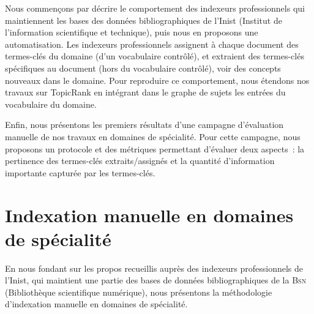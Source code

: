     Nous commençons par décrire le comportement des indexeurs
    professionnels qui maintiennent les bases des données bibliographiques de
    l'Inist (Institut de l'information scientifique et technique), puis nous en
    proposons une automatisation. Les indexeurs professionnels assignent à
    chaque document des termes-clés du domaine (d'un vocabulaire contrôlé), et
    extraient des termes-clés spécifiques au document (hors du vocabulaire
    contrôlé), voir des concepts nouveaux dans le domaine. Pour reproduire ce comportement, nous étendons nos travaux sur
    TopicRank en intégrant dans le graphe de sujets les entrées du vocabulaire
    du domaine.

    Enfin, nous présentons les premiers résultats d'une campagne d'évaluation
    manuelle de nos travaux en domaines de spécialité. Pour cette campagne,
    nous proposons un protocole et des métriques permettant d'évaluer deux
    aspects~: la pertinence des termes-clés extraits/assignés et la quantité
    d'information importante capturée par les termes-clés.


  \section{Indexation manuelle en domaines de spécialité}
  \label{sec:main-domain_specific_keyphrase_annotation-manual_keyphrase_annotation}
    En nous fondant sur les  propos recueillis auprès des indexeurs
    professionnels de l'Inist, qui maintient une partie des bases de données
    bibliographiques de la \textsc{Bsn} (Bibliothèque scientifique numérique),
    nous présentons la méthodologie d'indexation manuelle en domaines de
    spécialité.


